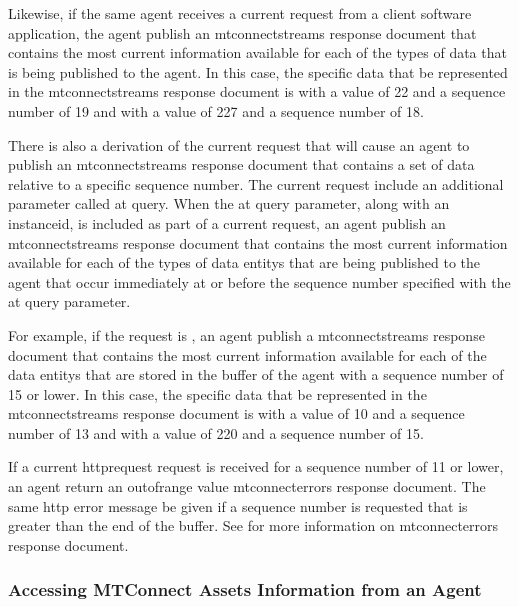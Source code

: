 Likewise, if the same \gls{agent} receives a \gls{current request} from a client software application, the \gls{agent} \MUST publish an \gls{mtconnectstreams response document} that contains the most current information available for each of the types of data that is being published to the \gls{agent}.  In this case, the specific data that \MUST be represented in the \gls{mtconnectstreams response document} is  with a value of 22 and a \gls{sequence number} of 19 and  with a value of 227 and a \gls{sequence number} of 18.

There is also a derivation of the \gls{current request} that will cause an \gls{agent} to publish an \gls{mtconnectstreams response document} that contains a set of data relative to a specific sequence number.  The \gls{current request} \MAY include an additional parameter called \gls{at query}.  When the \gls{at query} parameter, along with an \gls{instanceid}, is included as part of a \gls{current request}, an \gls{agent} \MUST publish an \gls{mtconnectstreams response document} that contains the most current information available for each of the types of \glspl{data entity} that are being published to the \gls{agent} that occur immediately at or before the \gls{sequence number} specified with the \gls{at query} parameter.

For example, if the \gls{request} is , an \gls{agent} \MUST publish a \gls{mtconnectstreams response document} that contains the most current information available for each of the \glspl{data entity} that are stored in the \gls{buffer} of the \gls{agent} with a \gls{sequence number} of 15 or lower.  In this case, the specific data that \MUST be represented in the \gls{mtconnectstreams response document} is  with a value of 10 and a \gls{sequence number} of 13 and  with a value of 220 and a \gls{sequence number} of 15.

If a \gls{current httprequest} \gls{request} is received for a \gls{sequence number} of 11 or lower, an \gls{agent} \MUST return an \gls{outofrange value} \gls{mtconnecterrors response document}.  The same \gls{http error message} \MUST be given if a \gls{sequence number} is requested that is greater than the end of the \gls{buffer}.  See  for more information on \gls{mtconnecterrors response document}.

\subsubsection{Accessing MTConnect Assets Information from an Agent}

